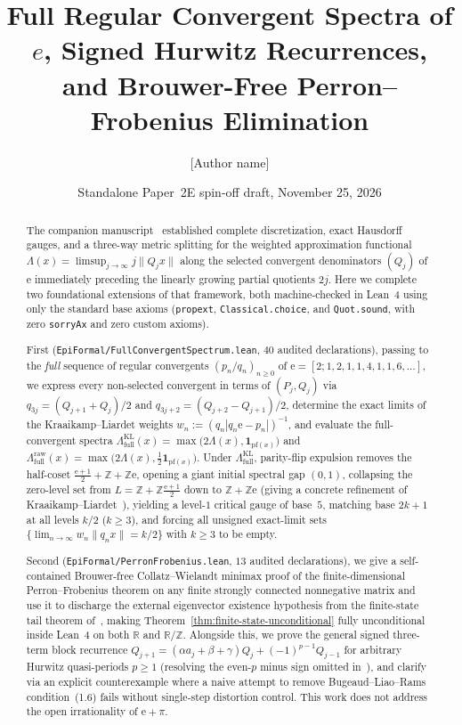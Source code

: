 \documentclass[11pt]{article}
\title{Full Regular Convergent Spectra of $e$, Signed Hurwitz Recurrences,\\
and Brouwer-Free Perron--Frobenius Elimination}
\author{[Author name]\\ \relax[Affiliation]}
\date{Standalone Paper~2E spin-off draft, November 25, 2026}
\theoremstyle{definition}
\theoremstyle{remark}
\newcommand{\R}{\mathbb{R}}
\newcommand{\Z}{\mathbb{Z}}
\newcommand{\ee}{\mathrm{e}}
\newcommand{\Lam}{\Lambda}
\begin{document}
\maketitle

\begin{abstract}
The companion manuscript~\cite{Paper2} established complete discretization,
exact Hausdorff gauges, and a three-way metric splitting for the weighted
approximation functional $\Lam(x)=\limsup_{j\to\infty}j\|Q_j x\|$ along the
selected convergent denominators $(Q_j)$ of $\ee$ immediately preceding the
linearly growing partial quotients $2j$. Here we complete two foundational
extensions of that framework, both machine-checked in Lean~4 using only the
standard base axioms (\texttt{propext}, \texttt{Classical.choice}, and
\texttt{Quot.sound}, with zero \texttt{sorryAx} and zero custom axioms).

First (\texttt{EpiFormal/\allowbreak FullConvergentSpectrum.lean}, $40$
audited declarations), passing to the \emph{full} sequence of regular
convergents $(p_n/q_n)_{n\ge0}$ of
$\ee=[2;1,2,1,1,4,1,1,6,\dots]$, we express every non-selected convergent in
terms of $(P_j,Q_j)$ via $q_{3j}=(Q_{j+1}+Q_j)/2$ and
$q_{3j+2}=(Q_{j+2}-Q_{j+1})/2$, determine the exact limits of the
Kraaikamp--Liardet weights $w_n:=(q_n|q_n\ee-p_n|)^{-1}$, and evaluate the
full-convergent spectra
$\Lam_{\mathrm{full}}^{\mathrm{KL}}(x)=\max\bigl(2\Lam(x),\mathbf{1}_{\mathrm{pf}(x)}\bigr)$
and
$\Lam_{\mathrm{full}}^{\mathrm{raw}}(x)=\max\bigl(2\Lam(x),\tfrac12\mathbf{1}_{\mathrm{pf}(x)}\bigr)$.
Under $\Lam_{\mathrm{full}}^{\mathrm{KL}}$, parity-flip expulsion removes the
half-coset $\frac{\ee+1}{2}+\Z+\Z\ee$, opening a giant initial spectral gap
$(0,1)$, collapsing the zero-level set from $L=\Z+\Z\frac{\ee+1}{2}$ down to
$\Z+\Z\ee$ (giving a concrete refinement of Kraaikamp--Liardet~\cite{KL}),
yielding a level-$1$ critical gauge of base~$5$, matching base $2k+1$ at all
levels $k/2$ ($k\ge3$), and forcing all unsigned exact-limit sets
$\{\lim_{n\to\infty}w_n\|q_n x\|=k/2\}$ with $k\ge3$ to be empty.

Second (\texttt{EpiFormal/\allowbreak PerronFrobenius.lean}, $13$ audited
declarations), we give a self-contained Brouwer-free Collatz--Wielandt minimax
proof of the finite-dimensional Perron--Frobenius theorem on any finite
strongly connected nonnegative matrix and use it to discharge the external
eigenvector existence hypothesis from the finite-state tail theorem of~\cite{Paper2},
making Theorem~\ref{thm:finite-state-unconditional} fully unconditional inside
Lean~4 on both $\R$ and $\R/\Z$. Alongside this, we prove the general signed
three-term block recurrence $Q_{j+1}=(\alpha a_j+\beta+\gamma)Q_j+(-1)^{p-1}Q_{j-1}$
for arbitrary Hurwitz quasi-periods $p\ge1$ (resolving the even-$p$ minus sign
omitted in~\cite{Paper2}), and clarify via an explicit counterexample where a
naive attempt to remove Bugeaud--Liao--Rams condition~(1.6) fails without
single-step distortion control. This work does not address the open
irrationality of $\ee+\pi$.
\end{abstract}
\end{document}
